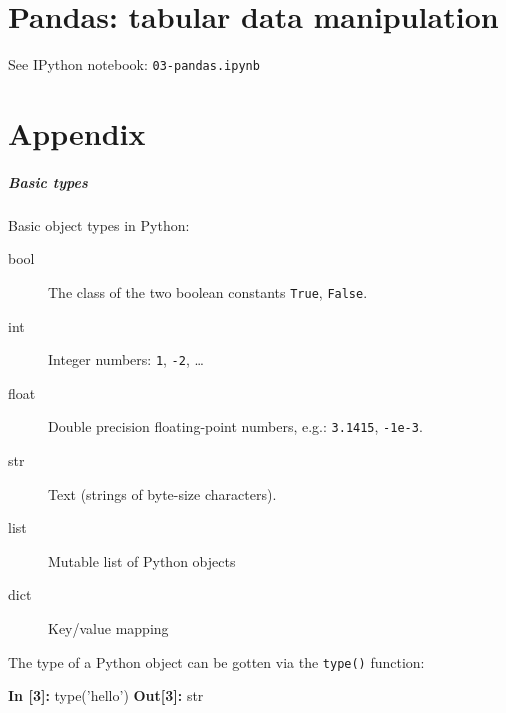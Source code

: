 \documentclass[english,serif,mathserif,xcolor=pdftex,dvipsnames,table]{beamer}
\begin{document}
\part{Pandas: tabular data manipulation}

\begin{frame}

  {\Huge See IPython notebook:
    \texttt{03-pandas.ipynb}}
\end{frame}





\part{Appendix}

\begin{frame}[fragile]
  \frametitle{Basic types}
  Basic object types in Python:
  \begin{description}
  \item[bool] The class of the two boolean constants \texttt{True}, \texttt{False}.
  \item[int] Integer numbers: \texttt{1}, \texttt{-2}, \ldots
  \item[float] Double precision floating-point numbers, e.g.:
    \texttt{3.1415}, \texttt{-1e-3}.
  \item[str] Text (strings of byte-size characters).
  \item[list] Mutable list of Python objects
  \item[dict] Key/value mapping
  \end{description}

  \+ The type of a Python object can be gotten via the \texttt{type()} function:
\begin{semiverbatim}
{\color{blue}\bfseries In [3]:} type('hello')
{\color{red}\bfseries Out[3]:} str
\end{semiverbatim}
\end{frame}
\end{document}
